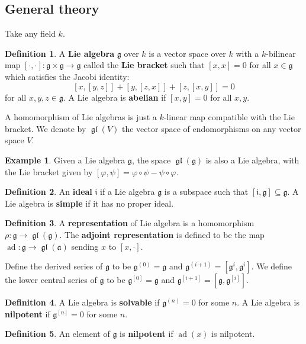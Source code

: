 \documentclass[12pt]{report}
\theoremstyle{remark}
\theoremstyle{definition}
\newtheorem{example}{Example}[section]
\newtheorem{definition}{Definition}[section]
\newcommand{\gl}{\operatorname{\mathfrak{gl}}}
\newcommand{\ad}{\operatorname{ad}}
\begin{document}
    \subsection{General theory}
    Take any field $k$.
    \begin{definition}
        A \textbf{Lie algebra} $\mathfrak g$ over $k$ is a vector space over $k$ with a $k$-bilinear map $[\cdot, \cdot]:\mathfrak g\times\mathfrak g\to\mathfrak g$ called the \textbf{Lie bracket} such that $[x, x]=0$ for all $x\in \mathfrak g$ which satisfies the Jacobi identity:
        \[[x, [y, z]]+[y,[z, x]]+[z,[x, y]]=0\]
        for all $x, y, z\in\mathfrak g$. A Lie algebra is \textbf{abelian} if $[x, y]=0$ for all $x, y$.
    \end{definition}
    A homomorphism of Lie algebras is just a $k$-linear map compatible with the Lie bracket. We denote by $\gl(V)$ the vector space of endomorphisms on any vector space $V$.
    \begin{example}
        Given a Lie algebra $\mathfrak g$, the space $\gl(\mathfrak g)$ is also a Lie algebra, with the Lie bracket given by $[\varphi, \psi]=\varphi\circ\psi-\psi\circ\varphi$.
    \end{example}
    \begin{definition}
        An \textbf{ideal} $\mathfrak i$ if a Lie algebra $\mathfrak g$ is a subspace such that $[\mathfrak i, \mathfrak g]\subseteq\mathfrak g$. A Lie algebra is \textbf{simple} if it has no proper ideal.
    \end{definition}
    \begin{definition}
        A \textbf{representation} of Lie algebra is a homomorphism $\rho:\mathfrak g\to\gl(\mathfrak g)$. The \textbf{adjoint representation} is defined to be the map $\ad:\mathfrak g\to\gl(\mathfrak a)$ sending $x$ to $[x,\cdot]$.
    \end{definition}
    Define the derived series of $\mathfrak g$ to be $\mathfrak g^{(0)}=\mathfrak g$ and $\mathfrak g^{(i+1)}=[\mathfrak g^{i},\mathfrak g^{i}]$. We define the lower central series of $\mathfrak g$ to be $\mathfrak g^{[0]}=\mathfrak g$ and $\mathfrak g^{[i+1]}=[\mathfrak g,\mathfrak g^{[i]}]$.
    \begin{definition}
        A Lie algebra is \textbf{solvable} if $\mathfrak g^{(n)}=0$ for some $n$. A Lie algebra is \textbf{nilpotent} if $\mathfrak g^{[n]}=0$ for some $n$.
    \end{definition}
    \begin{definition}
        An element of $\mathfrak g$ is \textbf{nilpotent} if $\ad(x)$ is nilpotent. 
    \end{definition}
\end{document}

